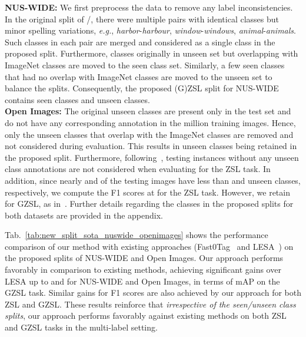 \documentclass[10pt,journal,compsoc]{IEEEtran}
\begin{document}
\noindent\textbf{NUS-WIDE:} We first preprocess the data to remove any label  inconsistencies. In the original split of /, there were multiple pairs with identical classes but minor spelling variations, \textit{e.g.}, \textit{harbor}-\textit{harbour}, \textit{window}-\textit{windows}, \textit{animal}-\textit{animals}. Such classes in each pair are merged and considered as a single class in the proposed split. Furthermore, classes originally in unseen set but overlapping with ImageNet classes are moved to the seen class set. Similarly, a few seen classes that had no overlap with ImageNet classes are moved to the unseen set to balance the splits. Consequently, the proposed (G)ZSL split for NUS-WIDE contains  seen classes and  unseen classes. \\
\noindent\textbf{Open Images:} The original  unseen classes are present only in the test set and do not have any corresponding annotation in the  million training images. Hence, only the unseen classes that overlap with the ImageNet classes are removed and not considered during evaluation. This results in  unseen classes being retained in the proposed split. Furthermore, following~\cite{huynh2020shared}, testing instances without any unseen class annotations are not considered when evaluating for the ZSL task. In addition, since nearly  and  of the testing images have less than  and  unseen classes, respectively, we compute the F1 scores at  for the ZSL task. However, we retain  for GZSL, as in~\cite{huynh2020shared}. Further details regarding the classes in the proposed splits for both datasets are provided in the appendix.

Tab.~\ref{tab:new_split_sota_nuswide_openimages} shows the performance comparison of our method with existing approaches (Fast0Tag~\cite{zhang2016fast} and LESA~\cite{huynh2020shared}) on the proposed splits of NUS-WIDE and Open Images. Our approach performs favorably in comparison to existing methods, achieving significant gains over LESA up to  and  for NUS-WIDE and Open Images, in terms of mAP on the GZSL task. Similar gains for F1 scores are also achieved by our approach for both ZSL and GZSL. These results reinforce that \textit{irrespective of the seen/unseen class splits}, our approach performs favorably against existing methods on both ZSL and GZSL tasks in the multi-label setting.
\end{document}
